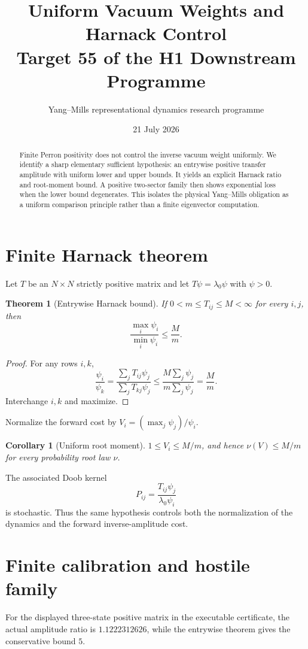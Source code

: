 \documentclass[11pt]{article}
\title{Uniform Vacuum Weights and Harnack Control\\Target 55 of the H1 Downstream Programme}
\author{Yang--Mills representational dynamics research programme}
\date{21 July 2026}
\newtheorem{theorem}{Theorem}
\newtheorem{corollary}{Corollary}
\begin{document}
\maketitle
\begin{abstract}
Finite Perron positivity does not control the inverse vacuum weight uniformly.
We identify a sharp elementary sufficient hypothesis: an entrywise positive
transfer amplitude with uniform lower and upper bounds.  It yields an explicit
Harnack ratio and root-moment bound.  A positive two-sector family then shows
exponential loss when the lower bound degenerates.  This isolates the physical
Yang--Mills obligation as a uniform comparison principle rather than a finite
eigenvector computation.
\end{abstract}

\section{Finite Harnack theorem}
Let $T$ be an $N\times N$ strictly positive matrix and let
$T\psi=\lambda_0\psi$ with $\psi>0$.
\begin{theorem}[Entrywise Harnack bound]
If $0<m\leq T_{ij}\leq M<\infty$ for every $i,j$, then
\begin{equation}\label{eq:harnack}
 \frac{\max_i\psi_i}{\min_i\psi_i}\leq\frac{M}{m}.
\end{equation}
\end{theorem}
\begin{proof}
For any rows $i,k$,
\[
 \frac{\psi_i}{\psi_k}
 =\frac{\sum_jT_{ij}\psi_j}{\sum_jT_{kj}\psi_j}
 \leq\frac{M\sum_j\psi_j}{m\sum_j\psi_j}=\frac Mm.
\]
Interchange $i,k$ and maximize.
\end{proof}

Normalize the forward cost by $V_i=(\max_j\psi_j)/\psi_i$.
\begin{corollary}[Uniform root moment]
$1\leq V_i\leq M/m$, and hence $\nu(V)\leq M/m$ for every probability root
law $\nu$.
\end{corollary}
The associated Doob kernel
\[
 P_{ij}=\frac{T_{ij}\psi_j}{\lambda_0\psi_i}
\]
is stochastic.  Thus the same hypothesis controls both the normalization of
the dynamics and the forward inverse-amplitude cost.

\section{Finite calibration and hostile family}
For the displayed three-state positive matrix in the executable certificate,
the actual amplitude ratio is $1.1222312626$, while the entrywise theorem gives
the conservative bound $5$.
\end{document}

